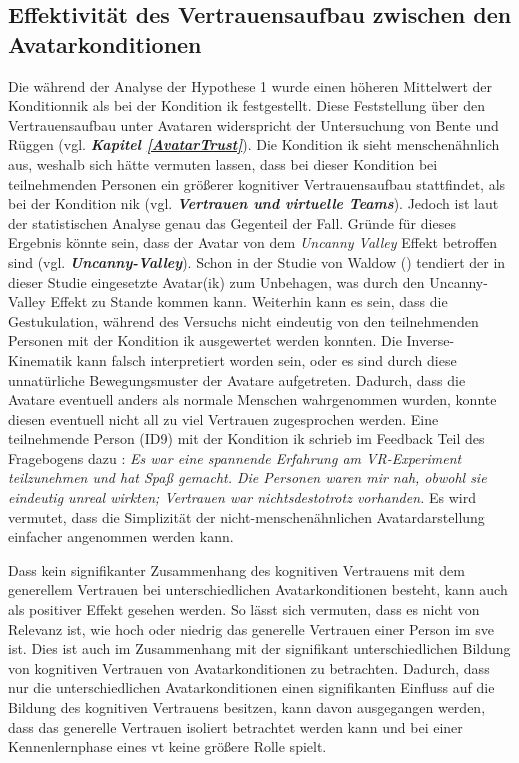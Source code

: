 \documentclass[a4paper,11pt]{article}%
\renewcommand{\\}{\vspace*{0.5\baselineskip} \newline}
\begin{document}
\subsection{Effektivität des Vertrauensaufbau zwischen den Avatarkonditionen}

Die während der Analyse der Hypothese 1 wurde einen höheren Mittelwert der Kondition\newline \ac{nik} als bei der Kondition \ac{ik} festgestellt. Diese Feststellung über den Vertrauensaufbau unter Avataren widerspricht der Untersuchung von Bente und Rüggen (vgl. \textbf{\textit{ Kapitel \ref{AvatarTrust}}}). Die Kondition \ac{ik} sieht menschenähnlich aus, weshalb sich hätte vermuten lassen, dass bei dieser Kondition bei teilnehmenden Personen ein größerer kognitiver Vertrauensaufbau stattfindet, als bei der Kondition \ac{nik}  (vgl. \textbf{\textit{Vertrauen und virtuelle Teams}}). Jedoch ist laut der statistischen Analyse genau das Gegenteil der Fall. Gründe für dieses Ergebnis könnte sein, dass der Avatar von dem \textit{Uncanny Valley} Effekt betroffen sind (vgl. \textbf{\textit{Uncanny-Valley}}). Schon in der Studie von Waldow (\citep{waldow2019investigating}) tendiert der in dieser Studie eingesetzte Avatar(\ac{ik}) zum Unbehagen, was durch den Uncanny-Valley Effekt zu Stande kommen kann. Weiterhin kann es sein, dass die Gestukulation, während des Versuchs nicht eindeutig von den teilnehmenden Personen mit der Kondition \ac{ik} ausgewertet werden konnten. Die Inverse-Kinematik kann falsch interpretiert worden sein, oder es sind durch diese unnatürliche Bewegungsmuster der Avatare aufgetreten. Dadurch, dass die Avatare eventuell \dq{}anders als normale Menschen\dq{} wahrgenommen wurden, konnte diesen eventuell nicht all zu viel Vertrauen zugesprochen werden.
Eine teilnehmende Person (ID9) mit der Kondition \ac{ik} schrieb im Feedback Teil des Fragebogens dazu : \newline
\dq{}\textit{Es war eine spannende Erfahrung am VR-Experiment teilzunehmen und hat Spaß gemacht. Die Personen waren mir nah, obwohl sie eindeutig unreal wirkten; Vertrauen war nichtsdestotrotz vorhanden.}\dq{}
Es wird vermutet, dass die Simplizität der nicht-menschenähnlichen Avatardarstellung einfacher angenommen werden kann.

Dass kein signifikanter Zusammenhang des kognitiven Vertrauens mit dem generellem Vertrauen bei unterschiedlichen Avatarkonditionen besteht, kann auch als positiver Effekt gesehen werden. 
So lässt sich vermuten, dass es nicht von Relevanz ist, wie hoch oder niedrig das generelle Vertrauen einer Person im \ac{sve} ist. Dies ist auch im Zusammenhang mit der signifikant unterschiedlichen Bildung von kognitiven Vertrauen von Avatarkonditionen zu betrachten. Dadurch, dass nur die unterschiedlichen Avatarkonditionen einen signifikanten Einfluss auf die Bildung des kognitiven Vertrauens besitzen, kann davon ausgegangen werden, dass das generelle Vertrauen isoliert betrachtet werden kann und bei einer Kennenlernphase eines \ac{vt} keine größere Rolle spielt.
\end{document}
